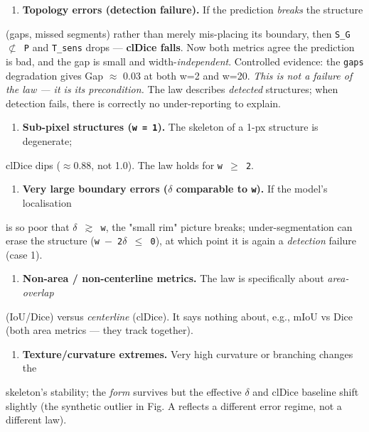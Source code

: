 \documentclass[11pt]{article}
\begin{document}
\begin{enumerate}\setlength{\itemsep}{1pt}
\item \textbf{Topology errors (detection failure).} If the prediction \textit{breaks} the structure
\end{enumerate}
   (gaps, missed segments) rather than merely mis-placing its boundary, then \texttt{S\_G $\not\subset$ P}    and \texttt{T\_sens} drops --- \textbf{clDice falls}. Now both metrics agree the prediction is    bad, and the gap is small and width-\textit{independent}. Controlled evidence: the \texttt{gaps}    degradation gives Gap $\approx$ 0.03 at both w=2 and w=20. \textit{This is not a failure of the    law --- it is its precondition.} The law describes \textit{detected} structures; when    detection fails, there is correctly no under-reporting to explain.

\begin{enumerate}\setlength{\itemsep}{1pt}
\item \textbf{Sub-pixel structures (\texttt{w = 1}).} The skeleton of a 1-px structure is degenerate;
\end{enumerate}
   clDice dips ($\approx$0.88, not 1.0). The law holds for \texttt{w $\geq$ 2}.

\begin{enumerate}\setlength{\itemsep}{1pt}
\item \textbf{Very large boundary errors (\texttt{$\delta$} comparable to \texttt{w}).} If the model's localisation
\end{enumerate}
   is so poor that \texttt{$\delta$ $\gtrsim$ w}, the "small rim" picture breaks; under-segmentation can    erase the structure (\texttt{w $-$ 2$\delta$ $\leq$ 0}), at which point it is again a \textit{detection}    failure (case 1).

\begin{enumerate}\setlength{\itemsep}{1pt}
\item \textbf{Non-area / non-centerline metrics.} The law is specifically about \textit{area-overlap}
\end{enumerate}
   (IoU/Dice) versus \textit{centerline} (clDice). It says nothing about, e.g., mIoU vs Dice    (both area metrics --- they track together).

\begin{enumerate}\setlength{\itemsep}{1pt}
\item \textbf{Texture/curvature extremes.} Very high curvature or branching changes the
\end{enumerate}
   skeleton's stability; the \textit{form} survives but the effective \texttt{$\delta$} and clDice baseline    shift slightly (the synthetic outlier in Fig. A reflects a different error regime,    not a different law).
\end{document}
